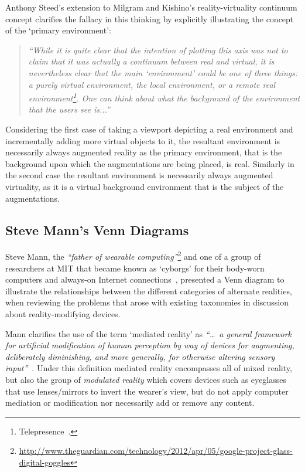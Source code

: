 Anthony Steed's extension to Milgram and Kishino's reality-virtuality continuum concept clarifies the fallacy in this thinking by explicitly illustrating the concept of the `primary environment':

\begin{quote}
\textit{``While it is quite clear that the intention of plotting this axis was not to claim that it was actually a continuum between real and virtual, it is nevertheless clear that the main `environment' could be one of three things: a purely virtual environment, the local environment, or a remote real environment\footnote{Telepresence~\cite{Sheridan1992a}.}. One can think about what the background of the environment that the users see is...''}~\cite{Steed2014}
\end{quote}

Considering the first case of taking a viewport depicting a real environment and incrementally adding more virtual objects to it, the resultant environment is necessarily always augmented reality as the primary environment, that is the background upon which the augmentations are being placed, is real. Similarly in the second case the resultant environment is necessarily always augmented virtuality, as it is a virtual background environment that is the subject of the augmentations.


\subsection{Steve Mann's Venn Diagrams}
\label{stevemannvenn}
Steve Mann, the \textit{``father of wearable computing''}\footnote{\url{http://www.theguardian.com/technology/2012/apr/05/google-project-glass-digital-goggles}} and one of a group of researchers at MIT that became known as `cyborgs' for their body-worn computers and always-on Internet connections~\cite{Turkle2011}, presented a Venn diagram to illustrate the relationships between the different categories of alternate realities, when reviewing the problems that arose with existing taxonomies in  discussion about reality-modifying devices.

Mann clarifies the use of the term `mediated reality' as \textit{``\ldots\ a general framework for artificial modification of human perception by way of devices for augmenting, deliberately diminishing, and more generally, for otherwise altering sensory input''}~\cite{Mann2002a}. Under this definition mediated reality encompasses all of mixed reality, but also the group of \textit{modulated reality} which covers devices such as eyeglasses that use lenses/mirrors to invert the wearer's view, but do not apply computer mediation or modification nor necessarily add or remove any content.

